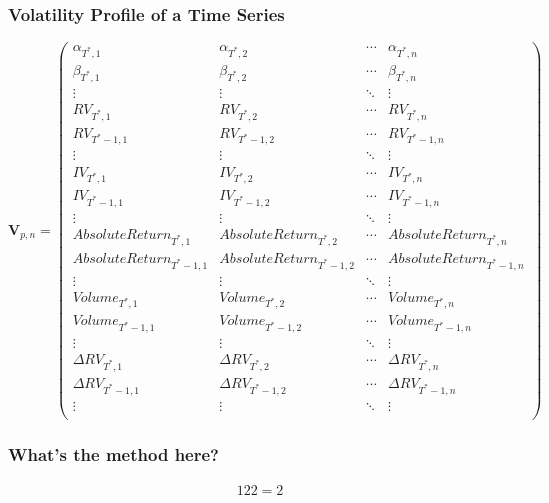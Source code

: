 \documentclass{beamer}
\theoremstyle{definition}
\begin{document}
\begin{frame}
\frametitle{Volatility Profile of a Time Series}
\fontsize{3}{12}
\begin{equation*}
    \textbf{V}_{p,n} = 
    \begin{pmatrix}
    \alpha_{T^{*},1} & \alpha_{T^{*},2}  & \cdots & \alpha_{T^{*},n}  \\
    \beta_{T^{*},1} & \beta_{T^{*},2}  & \cdots & \beta_{T^{*},n}  \\
    \vdots  & \vdots  & \ddots & \vdots  \\
    RV_{T^{*},1} & RV_{T^{*},2}  & \cdots & RV_{T^{*},n}  \\
    RV_{T^{*}-1,1}  & RV_{T^{*}-1,2}  & \cdots & RV_{T^{*}-1,n}  \\
    \vdots  & \vdots  & \ddots & \vdots  \\
    IV_{T^{*},1} & IV_{T^{*},2} & \cdots & IV_{T^{*},n} \\
    IV_{T^{*}-1,1}  & IV_{T^{*}-1,2}  & \cdots & IV_{T^{*}-1,n} \\
    \vdots  & \vdots  & \ddots & \vdots  \\
    AbsoluteReturn_{T^{*},1} & AbsoluteReturn_{T^{*},2} & \cdots & AbsoluteReturn_{T^{*},n} \\
    AbsoluteReturn_{T^{*}-1,1}  & AbsoluteReturn_{T^{*}-1,2}  & \cdots & AbsoluteReturn_{T^{*}-1,n} \\
    \vdots  & \vdots  & \ddots & \vdots  \\
    Volume_{T^{*},1}  & Volume_{T^{*},2}  & \cdots & Volume_{T^{*},n} \\
    Volume_{T^{*}-1,1}  & Volume_{T^{*}-1,2}  & \cdots & Volume_{T^{*}-1,n}  \\
    \vdots  & \vdots  & \ddots & \vdots  \\
    \Delta RV_{T^{*},1} & \Delta RV_{T^{*},2}  & \cdots & \Delta RV_{T^{*},n}  \\
    \Delta RV_{T^{*}-1,1}  & \Delta RV_{T^{*}-1,2}  & \cdots & \Delta RV_{T^{*}-1,n}  \\
    \vdots  & \vdots  & \ddots & \vdots  \\
    \end{pmatrix}
    \end{equation*}
\end{frame}


\begin{frame}
\frametitle{What's the method here?}
    \begin{alignat*}{12}
    2 = 2
    \end{alignat*}

\end{frame}
\end{document}
